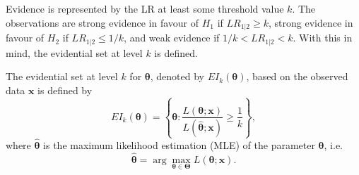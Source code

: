 \documentclass[twoside]{article}
\begin{document}
Evidence is represented by the LR at least some threshold value $k$. The observations are strong evidence in favour of $H_1$ if $LR_{1|2}\geq k$, strong evidence in favour of $H_2$ if $LR_{1|2}\leq 1/k$, and weak evidence if $1/k < LR_{1|2} < k$. With this in mind, the evidential set at level $k$ is defined.
\begin{dfn}\label{def:evidential:set:general}
The evidential set at level $k$ for $\mathbf{\theta}$, denoted by $EI_k(\mathbf{\theta})$, based on the observed data $\mathbf{x}$ is defined by
\begin{equation}\label{EIk:general}
EI_k(\mathbf{\theta})=\left\{\mathbf{\theta}:\frac{L(\mathbf{\theta};\mathbf{x})}{L(\hat{\mathbf{\theta}};\mathbf{x})}\geq \frac{1}{k}\right\},
\end{equation}
where $\hat{\mathbf{\theta}}$ is the maximum likelihood estimation (MLE) of the parameter $\mathbf{\theta}$, i.e.
\[\hat{\mathbf{\theta}}=\arg\max_{\mathbf{\theta}\in\mathbf{\Theta}} L(\mathbf{\theta};\mathbf{x}). \]
\end{dfn}
\end{document}
